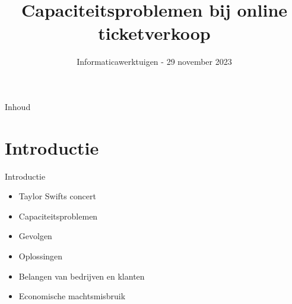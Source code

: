 \documentclass{beamer}
\title{\Huge{Capaciteitsproblemen bij online ticketverkoop}}
\author{{Sonia Amiri \and Rami Berro \and Florian Braùn \and Tom Cottem \and Thijs Creemers \and John Cai \and Lode Dockx}}
\date{\small{Informaticawerktuigen - 29 november 2023}}
\begin{document}
\begin{frame}
  \titlepage
\end{frame}

\begin{frame}{Inhoud}
  \tableofcontents
\end{frame}

\section[Intro]{Introductie}
\begin{frame}{Introductie}
    \begin{itemize}
        \item Taylor Swifts concert
        \item Capaciteitsproblemen
        \item Gevolgen
        \item Oplossingen
        \item Belangen van bedrijven en klanten
        \item Economische machtsmisbruik
    \end{itemize}
\end{frame}
\end{document}
